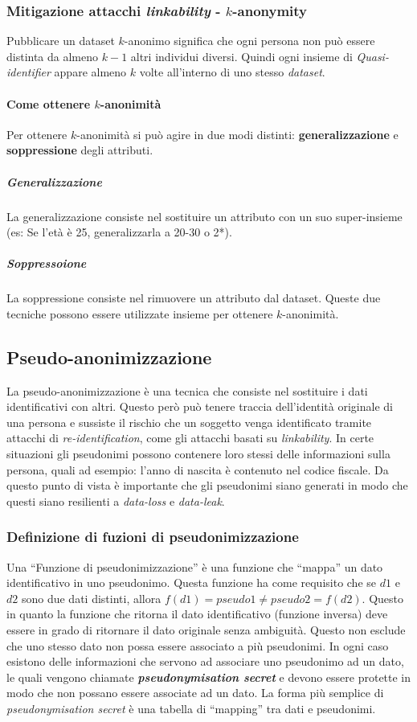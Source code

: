         \subsubsection{Mitigazione attacchi \textit{linkability} - $k$-anonymity}
                Pubblicare un dataset $k$-anonimo significa che ogni persona non può essere distinta da almeno $k-1$ altri individui diversi. Quindi ogni insieme di \textit{Quasi-identifier} appare almeno $k$ volte all'interno di uno stesso \textit{dataset}. 
            \paragraph{Come ottenere $k$-anonimità}
                Per ottenere $k$-anonimità si può agire in due modi distinti: \textbf{generalizzazione} e \textbf{soppressione} degli attributi.
                \subparagraph{Generalizzazione} La generalizzazione consiste nel sostituire un attributo con un suo super-insieme (es: Se l'età è 25, generalizzarla a 20-30 o 2*).
                \subparagraph{Soppressoione} La soppressione consiste nel rimuovere un attributo dal dataset. Queste due tecniche possono essere utilizzate insieme per ottenere $k$-anonimità.
    \subsection{Pseudo-anonimizzazione}
        La pseudo-anonimizzazione è una tecnica che consiste nel sostituire i dati identificativi con altri. Questo però può tenere traccia dell'identità originale di una persona e sussiste il rischio che un soggetto venga identificato tramite attacchi di \textit{re-identification}, come gli attacchi basati su \textit{linkability}. In certe situazioni gli pseudonimi possono contenere loro stessi delle informazioni sulla persona, quali ad esempio: l'anno di nascita è contenuto nel codice fiscale. Da questo punto di vista è importante che gli pseudonimi siano generati in modo che questi siano resilienti a \textit{data-loss} e \textit{data-leak}.
        \subsubsection{Definizione di fuzioni di pseudonimizzazione}
            Una ``Funzione di pseudonimizzazione'' è una funzione che ``mappa'' un dato identificativo in uno pseudonimo. Questa funzione ha come requisito che se $d1$ e $d2$ sono due dati distinti, allora $f(d1)=pseudo1 \neq pseudo2=f(d2)$. Questo in quanto la funzione che ritorna il dato identificativo (funzione inversa) deve essere in grado di ritornare il dato originale senza ambiguità. Questo non esclude che uno stesso dato non possa essere associato a più pseudonimi. In ogni caso esistono delle informazioni che servono ad associare uno pseudonimo ad un dato, le quali vengono chiamate \textbf{\textit{pseudonymisation secret}} e devono essere protette in modo che non possano essere associate ad un dato. La forma più semplice di \textit{pseudonymisation secret} è una tabella di ``mapping'' tra dati e pseudonimi.
